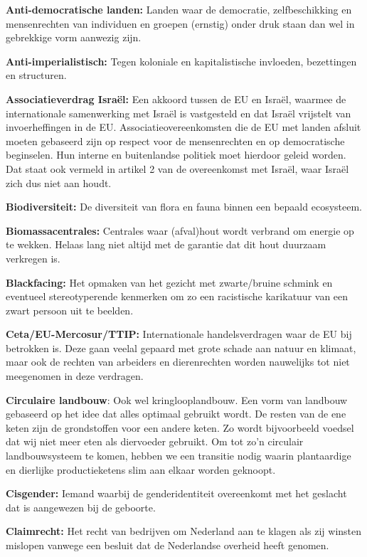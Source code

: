 \textbf{Anti-democratische landen:} Landen waar de democratie,
zelfbeschikking en mensenrechten van individuen en groepen (ernstig)
onder druk staan dan wel in gebrekkige vorm aanwezig zijn.

\textbf{Anti-imperialistisch:} Tegen koloniale en kapitalistische
invloeden, bezettingen en structuren.

\textbf{Associatieverdrag Israël:} Een akkoord tussen de EU en Israël,
waarmee de internationale samenwerking met Israël is vastgesteld en dat
Israël vrijstelt van invoerheffingen in de EU. Associatieovereenkomsten
die de EU met landen afsluit moeten gebaseerd zijn op respect voor de
mensenrechten en op democratische beginselen. Hun interne en
buitenlandse politiek moet hierdoor geleid worden. Dat staat ook vermeld
in artikel 2 van de overeenkomst met Israël, waar Israël zich dus niet
aan houdt.

\textbf{Biodiversiteit:} De diversiteit van flora en fauna binnen een
bepaald ecosysteem.

\textbf{Biomassacentrales:} Centrales waar (afval)hout wordt verbrand om
energie op te wekken. Helaas lang niet altijd met de garantie dat dit
hout duurzaam verkregen is.

\textbf{Blackfacing:} Het opmaken van het gezicht met zwarte/bruine
schmink en eventueel stereotyperende kenmerken om zo een racistische
karikatuur van een zwart persoon uit te beelden.

\textbf{Ceta/EU-Mercosur/TTIP:} Internationale handelsverdragen waar de
EU bij betrokken is. Deze gaan veelal gepaard met grote schade aan
natuur en klimaat, maar ook de rechten van arbeiders en dierenrechten
worden nauwelijks tot niet meegenomen in deze verdragen.

\textbf{Circulaire landbouw}: Ook wel kringlooplandbouw. Een vorm van
landbouw gebaseerd op het idee dat alles optimaal gebruikt wordt. De
resten van de ene keten zijn de grondstoffen voor een andere keten. Zo
wordt bijvoorbeeld voedsel dat wij niet meer eten als diervoeder
gebruikt. Om tot zo'n circulair landbouwsysteem te komen, hebben we een
transitie nodig waarin plantaardige en dierlijke productieketens slim
aan elkaar worden geknoopt.

\textbf{Cisgender:} Iemand waarbij de genderidentiteit overeenkomt met
het geslacht dat is aangewezen bij de geboorte.

\textbf{Claimrecht:} Het recht van bedrijven om Nederland aan te klagen
als zij winsten mislopen vanwege een besluit dat de Nederlandse overheid
heeft genomen.

